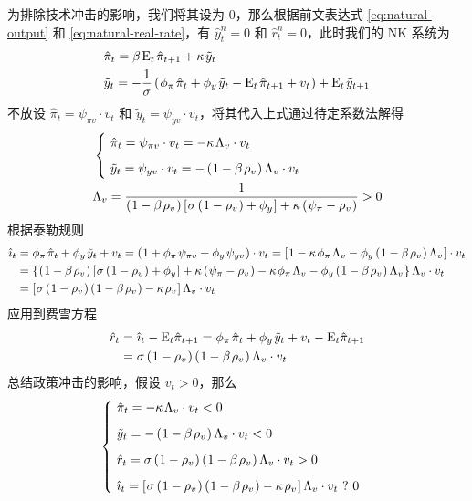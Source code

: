 为排除技术冲击的影响，我们将其设为 0，那么根据前文表达式 \ref{eq:natural-output} 和 \ref{eq:natural-real-rate}，有 \(\hat y^n_t=0\) 和 \(\hat r^n_t=0\)，此时我们的 NK 系统为
\begin{align*}
    &\hat\pi_t=\beta\,\meant\,\hat\pi\nt+\kappa\,\tilde y_t\\
    &\tilde y_t=-\dfrac1\sigma\bka{\phi_\pi\,\hat\pi_t+\phi_y\,\tilde y_t-\meant\,\hat\pi\nt+v_t}+\meant\,\tilde y\nt
\end{align*}
不放设 \(\hat\pi_t=\psi_{\pi v}\cdot v_t\) 和 \(\tilde y_t=\psi_{yv}\cdot v_t\)，将其代入上式通过待定系数法解得
\begin{align*}
    &\begin{cases}
        \ \hat\pi_t=\psi_{\pi v}\cdot v_t=-\kappa\,\Lambda_v\cdot v_t\\[6pt]
        \ \tilde y_t=\psi_{yv}\cdot v_t=-\bka{1-\beta\,\rho_v}\Lambda_v\cdot v_t
    \end{cases}\\
    &\Lambda_v=\dfrac1{\bka{1-\beta\,\rho_v}\bks{\sigma\bka{1-\rho_v}+\phi_y}+\kappa\bka{\psi_\pi-\rho_v}}>0
\end{align*}
根据泰勒规则
\begin{align*}
    \hat\imath_t&=\phi_\pi\,\hat\pi_t+\phi_y\,\tilde y_t+v_t=\bka{1+\phi_\pi\,\psi_{\pi v}+\phi_y\,\psi_{yv}}\cdot v_t=\bks{1-\kappa\,\phi_\pi\,\Lambda_v-\phi_y\bka{1-\beta\,\rho_v}\Lambda_v}\cdot v_t\\
    &=\bkd{\bka{1-\beta\,\rho_v}\bks{\sigma\bka{1-\rho_v}+\phi_y}+\kappa\bka{\psi_\pi-\rho_v}-\kappa\,\phi_\pi\,\Lambda_v-\phi_y\bka{1-\beta\,\rho_v}\Lambda_v}\Lambda_v\cdot v_t\\
    &=\bks{\sigma\bka{1-\rho_v}\bka{1-\beta\,\rho_v}-\kappa\,\rho_v}\Lambda_v\cdot v_t
\end{align*}
应用到费雪方程
\begin{align*}
    \hat r_t&=\hat\imath_t-\meant\hat\pi\nt=\phi_\pi\,\hat\pi_t+\phi_y\,\tilde y_t+v_t-\meant\hat\pi\nt\\
    &=\sigma\bka{1-\rho_v}\bka{1-\beta\,\rho_v}\Lambda_v\cdot v_t
\end{align*}
总结政策冲击的影响，假设 \(v_t>0\)，那么
\begin{equation*}
    \begin{cases}
        \ \hat\pi_t=-\kappa\,\Lambda_v\cdot v_t<0\\[6pt]
        \ \tilde y_t=-\bka{1-\beta\,\rho_v}\Lambda_v\cdot v_t<0\\[6pt]
        \ \hat r_t=\sigma\bka{1-\rho_v}\bka{1-\beta\,\rho_v}\Lambda_v\cdot v_t>0\\[6pt]
        \ \hat\imath_t=\bks{\sigma\bka{1-\rho_v}\bka{1-\beta\,\rho_v}-\kappa\,\rho_v}\Lambda_v\cdot v_t \ ? \ 0
    \end{cases}
\end{equation*}

